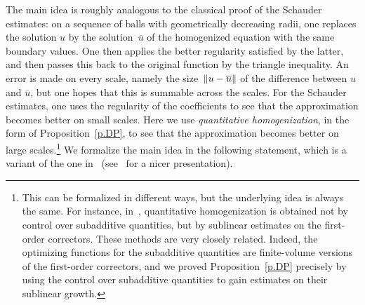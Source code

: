 \documentclass[11pt]{article} %
\numberwithin{equation}{section}
\theoremstyle{definition}
\let\originalleft\left
\let\originalright\right
\renewcommand{\left}{\mathopen{}\mathclose\bgroup\originalleft}
\renewcommand{\right}{\aftergroup\egroup\originalright}
\begin{document}
The main idea is roughly analogous to the classical proof of the Schauder estimates: on a sequence of  balls with geometrically decreasing radii, one replaces the solution $u$ by the solution~$\overline{u}$ of the homogenized equation with the same boundary values. One then applies the better regularity satisfied by the latter, and then passes this back to the original function by the triangle inequality. An error is made on every scale, namely the size~$\left\| u - \overline{u} \right\|$ of the difference between $u$ and $\overline{u}$, but one hopes that this is summable across the scales. For the Schauder estimates, one uses the regularity of the coefficients to see that the approximation becomes better on small scales. Here we use \emph{quantitative homogenization}, in the form of Proposition~\ref{p.DP}, to see that the approximation becomes better on large scales.\footnote{This can be formalized in different ways, but the underlying idea is always the same. For instance, in~\cite{GNO2}, quantitative homogenization is obtained not by control over subadditive quantities, but by sublinear estimates on the first-order correctors. These methods are very closely related. Indeed, the optimizing functions for the subadditive quantities are finite-volume versions of the first-order correctors, and we proved Proposition~\ref{p.DP} precisely by using the  control over subadditive quantities to gain estimates on their sublinear growth. 
}
We formalize the main idea in the following statement, which is a variant of the one in~\cite[Lemma 5.1]{AS} (see~\cite[Lemma 3.4]{AKMBook} for a nicer presentation). 
\end{document}
